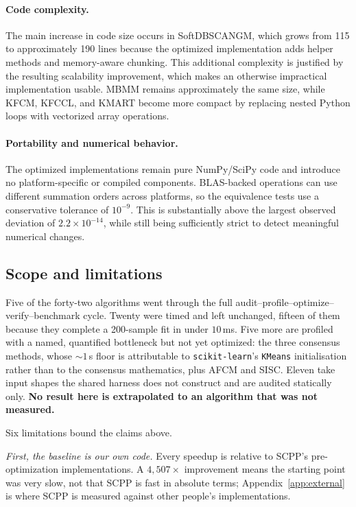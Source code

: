\documentclass[twoside,11pt]{article}
\begin{document}
\paragraph{Code complexity.}
The main increase in code size occurs in SoftDBSCANGM, which grows from 115 to
approximately 190 lines because the optimized implementation adds helper
methods and memory-aware chunking. This additional complexity is justified by
the resulting scalability improvement, which makes an otherwise impractical
implementation usable. MBMM remains approximately the same size, while KFCM,
KFCCL, and KMART become more compact by replacing nested Python loops with
vectorized array operations.

\paragraph{Portability and numerical behavior.}
The optimized implementations remain pure NumPy/SciPy code and introduce no
platform-specific or compiled components. BLAS-backed operations can use
different summation orders across platforms, so the equivalence tests use a
conservative tolerance of $10^{-9}$. This is substantially above the largest
observed deviation of $2.2\times10^{-14}$, while still being sufficiently
strict to detect meaningful numerical changes.

\subsection{Scope and limitations}

Five of the forty-two algorithms went through the full
audit--profile--optimize--verify--benchmark cycle. Twenty were timed and left
unchanged, fifteen of them because they complete a 200-sample fit in under
$10$\,ms. Five more are profiled with a named, quantified bottleneck but not
yet optimized: the three consensus methods, whose ${\sim}1$\,s floor is
attributable to \texttt{scikit-learn}'s \texttt{KMeans} initialisation rather
than to the consensus mathematics, plus AFCM and SISC. Eleven take input
shapes the shared harness does not construct and are audited statically only.
\textbf{No result here is extrapolated to an algorithm that was not
measured.}

Six limitations bound the claims above.

\emph{First, the baseline is our own code.} Every speedup is relative to
SCPP's pre-optimization implementations. A $4{,}507\times$ improvement means
the starting point was very slow, not that SCPP is fast in absolute terms;
Appendix~\ref{app:external} is where SCPP is measured against other people's
implementations.
\end{document}
